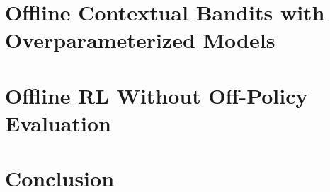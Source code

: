 \chapter{Offline Contextual Bandits with Overparameterized Models} \label{sec:offline-bandits}

\chapter{Offline RL Without Off-Policy Evaluation} \label{sec:offline-rl}



\chapter{Conclusion} \label{sec:conclusion}









% 




